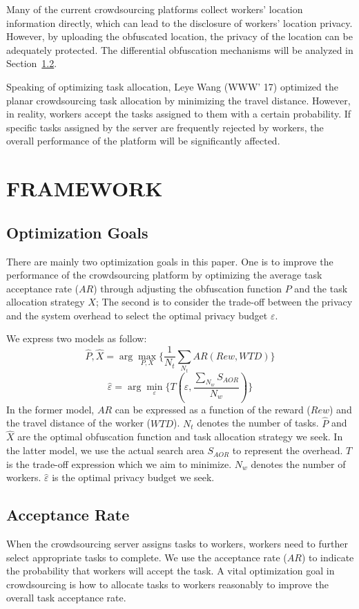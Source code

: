 Many of the current crowdsourcing platforms collect workers' location information directly, which can lead to the disclosure of workers' location privacy. However, by uploading the obfuscated location, the privacy of the location can be adequately protected. The differential obfuscation mechanisms will be analyzed in Section~\ref{Sec3.2}.

Speaking of optimizing task allocation, Leye Wang (WWW' 17) optimized the planar crowdsourcing task allocation by minimizing the travel distance. However, in reality, workers accept the tasks assigned to them with a certain probability. If specific tasks assigned by the server are frequently rejected by workers, the overall performance of the platform will be significantly affected.

\section{FRAMEWORK} %
\subsection{Optimization Goals} %
There are mainly two optimization goals in this paper. One is to improve the performance of the crowdsourcing platform by optimizing the average task acceptance rate ($AR$) through adjusting the obfuscation function $P$ and the task allocation strategy $X$; The second is to consider the trade-off between the privacy and the system overhead to select the optimal privacy budget $\varepsilon$.

We express two models as follow:
$$
	\hat{P} , \hat{X} = \arg \max_{P,X} \{ \frac{1}{N_t} \sum_{N_t} AR(Rew,WTD) \}
$$
$$
	\hat{\varepsilon} = \arg \min_\varepsilon \{ T(\varepsilon , \frac{\sum_{N_w} S_{AOR}}{N_w}) \}
$$
In the former model, $AR$ can be expressed as a function of the reward ($Rew$) and the travel distance of the worker ($WTD$). $N_t$ denotes the number of tasks. $\hat{P}$ and $\hat{X}$ are the optimal obfuscation function and task allocation strategy we seek. In the latter model, we use the actual search area $S_{AOR}$ to represent the overhead. $T$ is the trade-off expression which we aim to minimize. $N_w$ denotes the number of workers. $\hat{\varepsilon}$ is the optimal privacy budget we seek.

\subsection{Acceptance Rate} %
\label{Sec3.2}
When the crowdsourcing server assigns tasks to workers, workers need to further select appropriate tasks to complete. We use the acceptance rate ($AR$) to indicate the probability that workers will accept the task. A vital optimization goal in crowdsourcing is how to allocate tasks to workers reasonably to improve the overall task acceptance rate.

